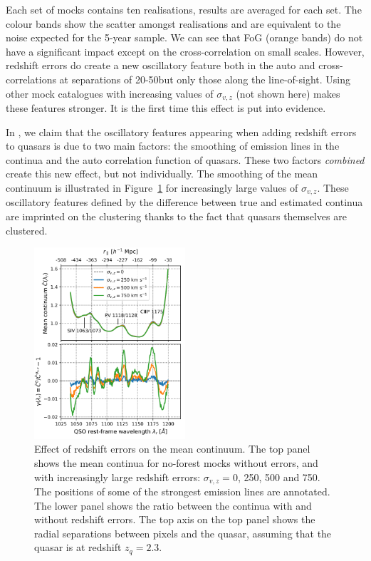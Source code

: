 Each set of mocks contains ten realisations, results are averaged for each set.
The colour bands show the scatter amongst realisations and are equivalent to the
noise expected for the 5-year sample. We can see that FoG (orange bands) do not 
have a significant impact except on the cross-correlation on small scales. 
However, redshift errors do create a new oscillatory feature both in the auto 
and cross-correlations at separations of 20-50\hmpc but only those along the 
line-of-sight. Using other mock catalogues with increasing values of 
$\sigma_{v, z}$ (not shown here) makes these features stronger. 
It is the first time this effect is put into evidence. 

In \cite{youlesEffectQuasarRedshift2022}, we claim that the oscillatory
features appearing when adding redshift errors to quasars is due to 
two main factors: the smoothing of emission lines in the continua and 
the auto correlation function of  quasars. 
These two factors \emph{combined} create this new effect, but not individually. 
The smoothing of the mean continuum is illustrated in Figure~\ref{fig:zerrors_continua}
for increasingly large values of $\sigma_{v, z}$. 
These oscillatory features defined by the difference between true and estimated continua are imprinted 
on the clustering thanks to the fact that quasars themselves are clustered. 


\begin{figure}[!th]
    \centering 
    \includegraphics[width=0.5\textwidth]{fig/forests/zerros_impact_continua.png}
    \caption{Effect of redshift errors on the mean continuum. 
    The top panel shows the mean continua for no-forest mocks without errors, 
    and with increasingly large redshift errors: $\sigma_{v, z} = 0$, 250, 500 and 750\kms. 
    The positions of some of the strongest emission lines are annotated. 
    The lower panel shows the ratio between the continua with and without redshift errors. 
    The top axis on the top panel shows the radial separations between pixels and the quasar, 
    assuming that the quasar is at redshift $z_q = 2.3$.}
    \label{fig:zerrors_continua}
\end{figure}

